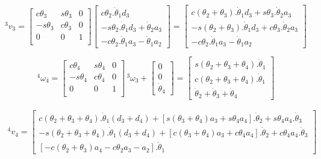 \begin{equation}
    ^3v_3 = \begin{bmatrix}
        c\theta_3 & s\theta_3 & 0 \\
        -s\theta_3 & c\theta_3 & 0 \\
        0 & 0 & 1 \\
    \end{bmatrix}
    \begin{bmatrix}
        c\theta_2.\dot{\theta}_1d_3 \\ 
        -s\theta_2.\dot{\theta}_1d_3 + \dot{\theta}_2a_3 \\ 
        -c\theta_2.\dot{\theta}_1a_3 - \dot{\theta}_1a_2
    \end{bmatrix} = 
    \begin{bmatrix}
        c(\theta_2 + \theta_3).\dot{\theta}_1d_3 + s\theta_3.\dot{\theta}_2a_3 \\ 
        -s(\theta_2 + \theta_3).\dot{\theta}_1d_3 + c\theta_3.\dot{\theta}_2a_3\\ 
        -c\theta_2.\dot{\theta}_1a_3 - \dot{\theta}_1a_2
    \end{bmatrix}
\end{equation}

\begin{equation}
    ^4\omega_4 = \begin{bmatrix}
        c\theta_4 & s\theta_4 & 0 \\
        -s\theta_4 & c\theta_4 & 0 \\
        0 & 0 & 1 \\
    \end{bmatrix} \, ^3\omega_3 + 
    \begin{bmatrix}
        0 \\ 0 \\ \dot{\theta}_4
    \end{bmatrix} = 
    \begin{bmatrix}
        s(\theta_2+\theta_3+\theta_4).\dot{\theta}_1 \\
        c(\theta_2+\theta_3+\theta_4).\dot{\theta}_1 \\ 
        \dot{\theta}_2 + \dot{\theta}_3 + \dot{\theta}_4
    \end{bmatrix}
\end{equation}

\begin{equation}
\begin{split}
    ^4v_4 = \begin{bmatrix}
        c(\theta_2 + \theta_3 + \theta_4).\dot{\theta}_1(d_3+d_4) + [s(\theta_3+\theta_4)a_3 + s\theta_4a_4].\dot{\theta}_2 + s\theta_4a_4.\dot{\theta}_3 \\ 
        -s(\theta_2 + \theta_3 + \theta_4).\dot{\theta}_1(d_3+d_4) + [c(\theta_3+\theta_4)a_3 + c\theta_4a_4].\dot{\theta}_2 + c\theta_4a_4.\dot{\theta}_3 \\ 
        [-c(\theta_2 + \theta_3)a_4 - c\theta_2a_3 - a_2].\dot{\theta}_1
    \end{bmatrix}
\end{split}
\end{equation}


